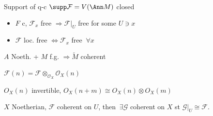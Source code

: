 \begin{definition} Support of q-c $\supp \mathcal{F} = V(\Ann M) $ closed
\end{definition}

\begin{proposition} 
\begin{itemize}[topsep=-6pt, itemsep=0pt]
    \item $F$ c, $\mathcal{F}_x$ free $ \Rightarrow \mathcal{F}|_{U} $ free for some $U \ni x$
    \item $\mathcal{F} $ loc. free $ \Leftrightarrow \mathcal{F}_x $ free $\ \forall  x$
\end{itemize}
\end{proposition}

\begin{proposition}
$A$ Noeth. + $M$ f.g. $ \Rightarrow \tilde{M}$ coherent
\end{proposition}

\begin{definition}[n-th twist]
$\mathcal{F}(n) = \mathcal{F} \otimes_{\mathcal{O}_X} \mathcal{O}_X(n)$
\end{definition}

\begin{proposition}
$O_X(n)$ invertible, $O_X(n+m) \cong O_X(n) \otimes O_X(m)$
\end{proposition}

\begin{definition}[Extension] $X$ Noetherian, $\mathcal{F} $ coherent on $U$, then $ \ \exists \mathcal{G} $ coherent on $X$ st $\mathcal{G}|_U \cong \mathcal{F}$.
\end{definition}